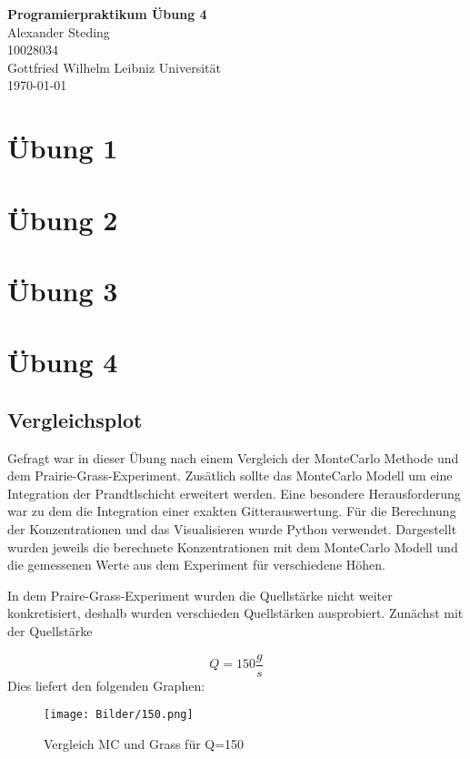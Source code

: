 \documentclass[ngerman]{scrartcl}
\newcommand{\authA}{Alexander Steding}
\begin{document}



\begin{titlepage}
\begin{center}
\vspace{3cm}
{\fontsize{40}{49} \selectfont \textbf{Programierpraktikum Übung 4}}\\[2cm]
\Large{\authA }\\
\Large{10028034 }\\
\large{Gottfried Wilhelm Leibniz Universität\\{\today}}
\end{center}
\end{titlepage}

\newpage

\section{Übung 1}
\section{Übung 2}
\section{Übung 3}
\section{Übung 4}
\subsection{Vergleichsplot}
Gefragt war in dieser Übung nach einem Vergleich der MonteCarlo Methode und dem Prairie-Grass-Experiment. Zusätlich sollte das MonteCarlo Modell um eine Integration der Prandtlschicht erweitert werden. Eine besondere Herausforderung war zu dem die Integration einer exakten Gitterauswertung. Für die Berechnung der Konzentrationen und das Visualisieren wurde Python verwendet. Dargestellt wurden jeweils die berechnete Konzentrationen mit dem MonteCarlo Modell und die gemessenen Werte aus dem Experiment für verschiedene Höhen.

In dem Praire-Grass-Experiment wurden die Quellstärke nicht weiter konkretisiert, deshalb wurden verschieden Quellstärken ausprobiert. Zunächst mit der Quellstärke

\begin{equation}
Q= 150 \frac{g}{s}
\end{equation}
Dies liefert den folgenden Graphen: 
\begin{figure}[H]
    \centering
    \texttt{[image: Bilder/150.png]}
    \caption{Vergleich MC und Grass für Q=150}
    \label{fig:my_label}
\end{figure}
\end{document}
